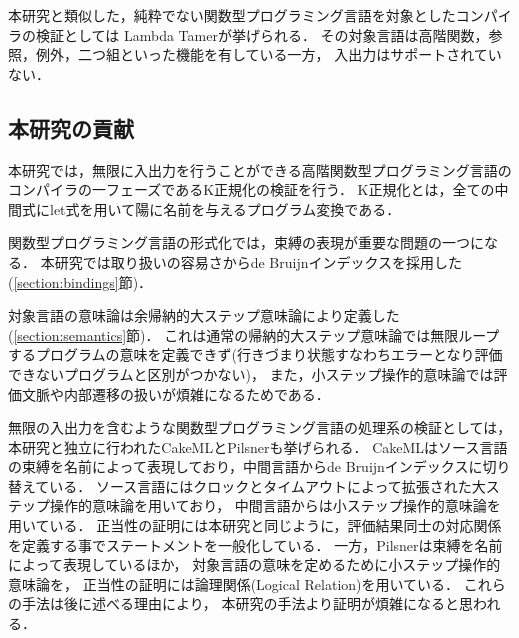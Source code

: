 \documentclass[T]{compsoft}
\begin{document}
本研究と類似した，純粋でない関数型プログラミング言語を対象としたコンパイラの検証としては
Lambda Tamer\cite{ImpurePOPL10}が挙げられる．
その対象言語は高階関数，参照，例外，二つ組といった機能を有している一方，
入出力はサポートされていない．

\subsection{本研究の貢献}
本研究では，無限に入出力を行うことができる高階関数型プログラミング言語のコンパイラの一フェーズであるK正規化の検証を行う．
K正規化とは，全ての中間式にlet式を用いて陽に名前を与えるプログラム変換である．

%
関数型プログラミング言語の形式化では，束縛の表現が重要な問題の一つになる．
本研究では取り扱いの容易さからde Bruijnインデックスを採用した(\ref{section:bindings}節)．


対象言語の意味論は余帰納的大ステップ意味論により定義した(\ref{section:semantics}節)．
これは通常の帰納的大ステップ意味論では無限ループするプログラムの意味を定義できず(行きづまり状態すなわちエラーとなり評価できないプログラムと区別がつかない)，
また，小ステップ操作的意味論では評価文脈や内部遷移の扱いが煩雑になるためである．

無限の入出力を含むような関数型プログラミング言語の処理系の検証としては，
本研究と独立に行われたCakeML\cite{CakeML:ICFP16}とPilsner\cite{DBLP:conf/icfp/NeisHKMDV15}も挙げられる．
CakeMLはソース言語の束縛を名前によって表現しており，中間言語からde Bruijnインデックスに切り替えている．
ソース言語にはクロックとタイムアウトによって拡張された大ステップ操作的意味論を用いており，
中間言語からは小ステップ操作的意味論を用いている．
正当性の証明には本研究と同じように，評価結果同士の対応関係を定義する事でステートメントを一般化している．
一方，Pilsnerは束縛を名前によって表現しているほか，
対象言語の意味を定めるために小ステップ操作的意味論を，
正当性の証明には論理関係(Logical Relation)を用いている．
これらの手法は後に述べる理由により，
本研究の手法より証明が煩雑になると思われる．
\end{document}
